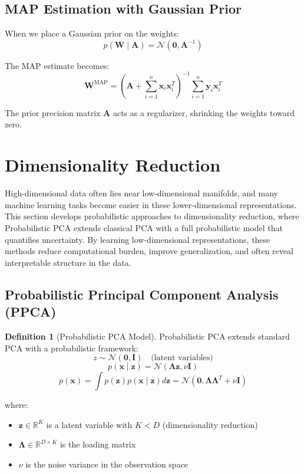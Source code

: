 \documentclass[12pt,a4paper]{article}
\theoremstyle{definition}
\newtheorem{definition}{Definition}[section]
\begin{document}
\subsection{MAP Estimation with Gaussian Prior}

When we place a Gaussian prior on the weights:
\[
p(\mathbf{W} \mid \mathbf{A}) = \mathcal{N}(\mathbf{0}, \mathbf{A}^{-1})
\]

The MAP estimate becomes:
\[
\mathbf{W}^{\text{MAP}} = \left(\mathbf{A} + \sum_{i=1}^n \mathbf{x}_i \mathbf{x}_i^T\right)^{-1} \sum_{i=1}^n \mathbf{y}_i \mathbf{x}_i^T
\]

The prior precision matrix $\mathbf{A}$ acts as a regularizer, shrinking the weights toward zero.

\section{Dimensionality Reduction}

High-dimensional data often lies near low-dimensional manifolds, and many machine learning tasks become easier in these lower-dimensional representations. This section develops probabilistic approaches to dimensionality reduction, where Probabilistic PCA extends classical PCA with a full probabilistic model that quantifies uncertainty. By learning low-dimensional representations, these methods reduce computational burden, improve generalization, and often reveal interpretable structure in the data.

\subsection{Probabilistic Principal Component Analysis (PPCA)}

\begin{definition}[Probabilistic PCA Model]
Probabilistic PCA extends standard PCA with a probabilistic framework:
\[
z \sim \mathcal{N}(\mathbf{0}, \mathbf{I}) \quad \text{(latent variables)}
\]
\[
p(\mathbf{x} \mid \mathbf{z}) = \mathcal{N}(\mathbf{\Lambda} \mathbf{z}, \nu \mathbf{I})
\]
\[
p(\mathbf{x}) = \int p(\mathbf{z}) p(\mathbf{x} \mid \mathbf{z}) d\mathbf{z} = \mathcal{N}(\mathbf{0}, \mathbf{\Lambda} \mathbf{\Lambda}^T + \nu \mathbf{I})
\]

where:
\begin{itemize}
    \item $\mathbf{z} \in \mathbb{R}^K$ is a latent variable with $K < D$ (dimensionality reduction)
    \item $\mathbf{\Lambda} \in \mathbb{R}^{D \times K}$ is the loading matrix
    \item $\nu$ is the noise variance in the observation space
\end{itemize}
\end{definition}
\end{document}
